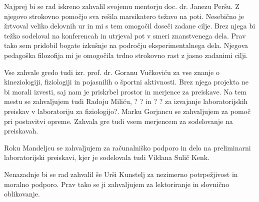 \zahvala 
Najprej bi se rad iskreno zahvalil svojemu mentorju doc. dr. Janezu Peršu. Z njegovo strokovno pomočjo sva rešila marsikatero težavo na poti. Nesebično je žrtvoval veliko delovnih ur in mi s tem omogočil doseči zadane cilje. Brez njega bi težko sodeloval na konferencah in utrjeval pot v smeri znanstvenega dela. Prav tako sem pridobil bogate izkušnje na področju eksperimentalnega dela. Njegova pedagoška filozofija mi je omogočila trdno strokovno rast z jasno zadanimi cilji.

Vse zahvale gredo tudi izr. prof. dr. Goranu Vučkoviću za vse znanje o kineziologiji, fiziologiji in pojasnilih o športni aktivnosti. Brez njega projekta ne bi morali izvesti, saj nam je priskrbel prostor in merjence za preiskave. Na tem mestu se zahvaljujem tudi Radoju Miliću, ? ? in ? ? za izvajanje laboratorijskih preiskav v laboratoriju za fiziologijo?. Marku Gorjancu se zahvaljujem za pomoč pri postavitvi opreme. Zahvala gre tudi vsem merjencem za sodelovanje na preiskavah. 

Roku Mandeljcu se zahvaljujem za računalniško podporo in delo na preliminarni laboratorijski preiskavi, kjer je sodelovala tudi Vildana Sulič Kenk.

Nenazadnje bi se rad zahvalil še Urši Kunstelj za nezimerno potrpežjivost in moralno podporo. Prav tako se ji zahvaljujem za lektoriranje in slovnično oblikovanje.